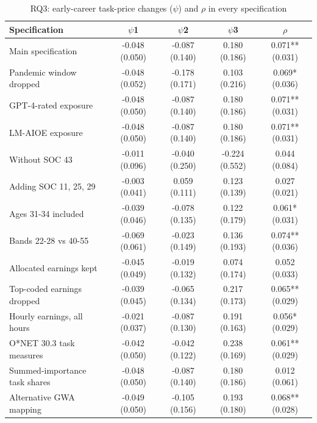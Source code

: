 \begin{table}[htbp]\centering
\caption{RQ3: early-career task-price changes ($\psi$) and $\rho$ in every specification}
\begin{tabular}{lcccc}
\toprule
Specification & $\psi$1 & $\psi$2 & $\psi$3 & $\rho$ \\
\midrule
Main specification & -0.048 (0.050) & -0.087 (0.140) & 0.180 (0.186) & 0.071** (0.031) \\
Pandemic window dropped & -0.048 (0.052) & -0.178 (0.171) & 0.103 (0.216) & 0.069* (0.036) \\
GPT-4-rated exposure & -0.048 (0.050) & -0.087 (0.140) & 0.180 (0.186) & 0.071** (0.031) \\
LM-AIOE exposure & -0.048 (0.050) & -0.087 (0.140) & 0.180 (0.186) & 0.071** (0.031) \\
Without SOC 43 & -0.011 (0.096) & -0.040 (0.250) & -0.224 (0.552) & 0.044 (0.084) \\
Adding SOC 11, 25, 29 & -0.003 (0.041) & 0.059 (0.111) & 0.123 (0.139) & 0.027 (0.021) \\
Ages 31-34 included & -0.039 (0.046) & -0.078 (0.135) & 0.122 (0.179) & 0.061* (0.031) \\
Bands 22-28 vs 40-55 & -0.069 (0.061) & -0.023 (0.149) & 0.136 (0.193) & 0.074** (0.036) \\
Allocated earnings kept & -0.045 (0.049) & -0.019 (0.132) & 0.074 (0.174) & 0.052 (0.033) \\
Top-coded earnings dropped & -0.039 (0.045) & -0.065 (0.134) & 0.217 (0.173) & 0.065** (0.029) \\
Hourly earnings, all hours & -0.021 (0.037) & -0.087 (0.130) & 0.191 (0.163) & 0.056* (0.029) \\
O*NET 30.3 task measures & -0.042 (0.050) & -0.042 (0.122) & 0.238 (0.169) & 0.061** (0.029) \\
Summed-importance task shares & -0.048 (0.050) & -0.087 (0.140) & 0.180 (0.186) & 0.012 (0.061) \\
Alternative GWA mapping & -0.049 (0.050) & -0.105 (0.156) & 0.193 (0.180) & 0.068** (0.028) \\
\bottomrule
\end{tabular}
\par\vspace{2pt}{\footnotesize Estimates of Eq. 7; Standard errors clustered on occupation in parentheses. * p<0.10, ** p<0.05, *** p<0.01.}
\end{table}
